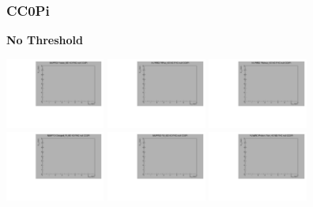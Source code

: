 \subsubsection{CC0Pi}

\textbf{No Threshold}

\begin{center}

  \includegraphics[width=0.245\textwidth]{plots/response_matrix/Proton_KE_FHC_CC0Pi_null.pdf}
  \includegraphics[width=0.245\textwidth]{plots/response_matrix/PiPlus_KE_FHC_CC0Pi_null.pdf}
  \includegraphics[width=0.245\textwidth]{plots/response_matrix/PiMinus_KE_FHC_CC0Pi_null.pdf}
  \includegraphics[width=0.245\textwidth]{plots/response_matrix/Charged_Pi_KE_FHC_CC0Pi_null.pdf}
  \includegraphics[width=0.245\textwidth]{plots/response_matrix/Pi0_KE_FHC_CC0Pi_null.pdf}
  \includegraphics[width=0.245\textwidth]{plots/response_matrix/Proton+Pion_KE_FHC_CC0Pi_null.pdf}

\end{center}

